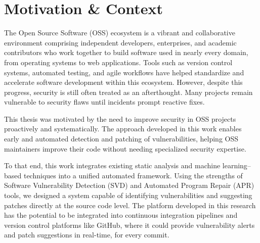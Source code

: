 \section{Motivation \& Context} \label{sec:se1}

The Open Source Software (OSS) ecosystem is a vibrant and collaborative environment comprising independent developers, enterprises, and academic contributors who work together to build software used in nearly every domain, from operating systems to web applications. Tools such as version control systems, automated testing, and agile workflows have helped standardize and accelerate software development within this ecosystem. However, despite this progress, security is still often treated as an afterthought. Many projects remain vulnerable to security flaws until incidents prompt reactive fixes.

This thesis was motivated by the need to improve security in OSS projects proactively and systematically. The approach developed in this work enables early and automated detection and patching of vulnerabilities, helping OSS maintainers improve their code without needing specialized security expertise.

To that end, this work integrates existing static analysis and machine learning–based techniques into a unified automated framework. Using the strengths of Software Vulnerability Detection (SVD) and Automated Program Repair (APR) tools, we designed a system capable of identifying vulnerabilities and suggesting patches directly at the source code level. The platform developed in this research has the potential to be integrated into continuous integration pipelines and version control platforms like GitHub, where it could provide vulnerability alerts and patch suggestions in real-time, for every commit.
